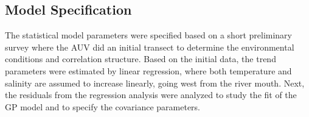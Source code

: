 \documentclass[aoas]{imsart}
\begin{document}
\subsection{Model Specification}

The statistical model parameters were specified based on a short preliminary survey where the AUV did an initial transect to determine the environmental conditions and correlation structure. Based on the initial data, the trend parameters were estimated by linear regression, where both temperature and salinity are assumed to increase linearly, going west from the river mouth. Next, the residuals from the regression analysis were analyzed to study the fit of the GP model and to specify the covariance parameters.

\end{document}
